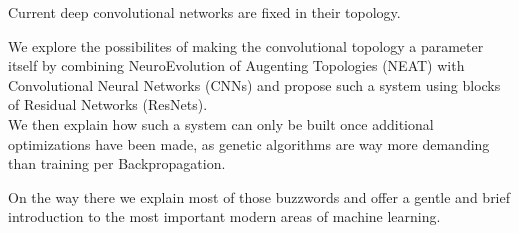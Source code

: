 Current deep convolutional networks are fixed in their topology.

We explore the possibilites of making the convolutional topology a parameter itself by combining NeuroEvolution of Augenting Topologies (NEAT) with Convolutional Neural Networks (CNNs) and propose such a system using blocks of Residual Networks (ResNets).\\
We then explain how such a system can only be built once additional optimizations have been made, as genetic algorithms are way more demanding than training per Backpropagation.

On the way there we explain most of those buzzwords and offer a gentle and brief introduction to the most important modern areas of machine learning.